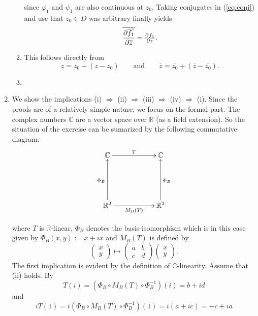 \begin{enumerate}[label = \textbf{Exercise \arabic*.},wide = 0pt, itemsep=1.5ex]
\begin{enumerate}[label = (\roman*),wide = 0pt, itemsep=1.5ex]
				\noindent since $\varphi_1$ and $\psi_1$ are also continuous at $z_0$. Taking conjugates in (\ref{eq:conj}) and use that $z_0 \in D$ was arbitrary finally yields
				\begin{equation}
					\overline{\frac{\partial\overline{f_1}}{\partial\overline{z}}} = \pd{f_1}{z}.
				\end{equation}

			\item This follows directly from
				\begin{equation}
					z = z_0 + (z - z_0) \qquad \text{and} \qquad \overline{z} = \overline{z_0} + (\overline{z} - \overline{z_0}).
				\end{equation}

			\item
		\end{enumerate}

	\item We show the implications (i) $\Rightarrow$ (ii) $\Rightarrow$ (iii) $\Rightarrow$ (iv) $\Rightarrow$ (i). Since the proofs are of a relatively simple nature, we focus on the formal part. The complex numbers $\mathbb{C}$ are a vector space over $\mathbb{R}$ (as a field extension). So the situation of the exercise can be sumarized by the following commutative diagram:
		\[
			\xymatrix@=2cm{
				\mathbb{C} \ar[r]^T &\mathbb{C}\\
				\mathbb{R}^2 \ar[u]^{\Phi_B} \ar[r]_{M_B(T)} &\mathbb{R}^2 \ar[u]_{\Phi_B}}
	 	\]

		\noindent where $T$ is $\mathbb{R}$-linear, $\Phi_B$ denotes the basis-isomorphism which is in this case given by $\Phi_B(x,y) := x + ix$ and $M_B(T)$ is defined by
		\begin{equation}
			\begin{pmatrix}
				x\\
				y
			\end{pmatrix} \mapsto
			\begin{pmatrix}
				a & b\\
				c & d
			\end{pmatrix}
			\begin{pmatrix}
				x\\
				y
			\end{pmatrix}.
		\end{equation}
		The first implication is evident by the definition of $\mathbb{C}$-linearity. Assume that (ii) holds. By 
		\begin{equation}
			T(i) = (\Phi_B \circ M_B(T) \circ \Phi_B^{-1})(i) = b + id
		\end{equation}
		\noindent and
		\begin{equation}
			iT(1) = i(\Phi_B \circ M_B(T) \circ \Phi_B^{-1})(1) = i(a + ic) = -c + ia 
		\end{equation}


\end{enumerate}
